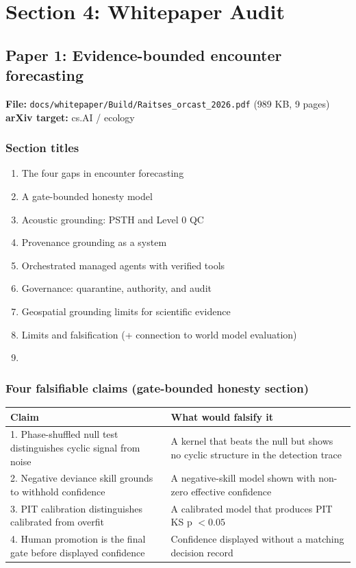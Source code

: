 \section{Section 4: Whitepaper Audit}

\subsection{Paper 1: Evidence-bounded encounter forecasting}

\textbf{File:} \texttt{docs/whitepaper/Build/Raitses\_orcast\_2026.pdf} (989 KB, 9 pages)\\
\textbf{arXiv target:} cs.AI / ecology

\subsubsection{Section titles}

\begin{enumerate}
\item The four gaps in encounter forecasting
\item A gate-bounded honesty model
\item Acoustic grounding: PSTH and Level 0 QC
\item Provenance grounding as a system
\item Orchestrated managed agents with verified tools
\item Governance: quarantine, authority, and audit
\item Geospatial grounding limits for scientific evidence
\item Limits and falsification (+ connection to world model evaluation)
\item [Appendix: diagrams, fig-mp1, fig-mp2, fig-mp3]
\end{enumerate}

\subsubsection{Four falsifiable claims (gate-bounded honesty section)}

\begin{center}
\begin{tabular}{p{7cm}p{6cm}}
\toprule
Claim & What would falsify it \\
\midrule
1. Phase-shuffled null test distinguishes cyclic signal from noise & A kernel that beats the null but shows no cyclic structure in the detection trace \\
2. Negative deviance skill grounds to withhold confidence & A negative-skill model shown with non-zero effective confidence \\
3. PIT calibration distinguishes calibrated from overfit & A calibrated model that produces PIT KS p $< 0.05$ \\
4. Human promotion is the final gate before displayed confidence & Confidence displayed without a matching decision record \\
\bottomrule
\end{tabular}
\end{center}

